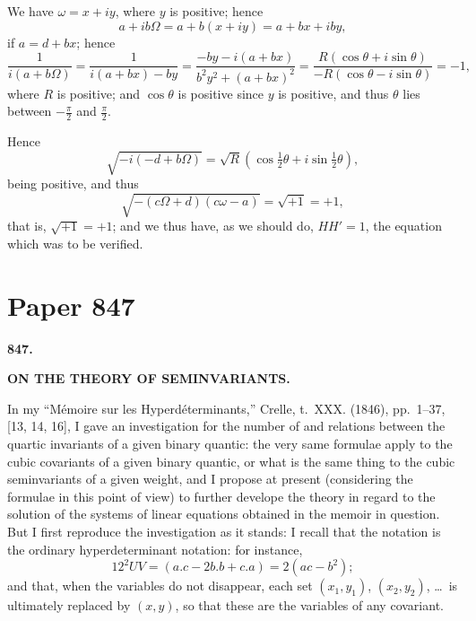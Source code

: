 \documentclass[11pt,a4paper]{article}
\theoremstyle{definition}
\begin{document}
We have $\omega = x + iy$, where $y$ is positive; hence
\[
a + ib\Omega = a + b(x + iy) = a + bx + iby,
\]
if $a = d + bx$; hence
\[
\frac{1}{i(a + b\Omega)} = \frac{1}{i(a + bx) - by} = \frac{-by - i(a + bx)}{b^2y^2 + (a + bx)^2} = \frac{R(\cos\theta + i\sin\theta)}{-R(\cos\theta - i\sin\theta)} = -1,
\]
where $R$ is positive; and $\cos\theta$ is positive since $y$ is positive, and thus $\theta$ lies between $-\frac{\pi}{2}$ and $\frac{\pi}{2}$.

Hence
\[
\sqrt{-i(-d + b\Omega)} = \sqrt{R}(\cos\tfrac{1}{2}\theta + i\sin\tfrac{1}{2}\theta),
\]
being positive, and thus
\[
\sqrt{-(c\Omega + d)(c\omega - a)} = \sqrt{+1} = +1,
\]
that is, $\sqrt{+1} = +1$; and we thus have, as we should do, $HH' = 1$, the equation which was to be verified.

\newpage

\section{Paper 847}

\begin{center}
\large\textbf{847.}

\Large\textbf{ON THE THEORY OF SEMINVARIANTS.}

\end{center}

\bigskip

In my ``M\'{e}moire sur les Hyperd\'{e}terminants,'' Crelle, t.~XXX. (1846), pp.~1--37, [13, 14, 16], I gave an investigation for the number of and relations between the quartic invariants of a given binary quantic: the very same formulae apply to the cubic covariants of a given binary quantic, or what is the same thing to the cubic seminvariants of a given weight, and I propose at present (considering the formulae in this point of view) to further develope the theory in regard to the solution of the systems of linear equations obtained in the memoir in question. But I first reproduce the investigation as it stands: I recall that the notation is the ordinary hyperdeterminant notation: for instance,
\[
12^2UV = (a.c - 2b.b + c.a) = 2(ac - b^2);
\]
and that, when the variables do not disappear, each set $(x_1, y_1)$, $(x_2, y_2)$, \ldots\ is ultimately replaced by $(x, y)$, so that these are the variables of any covariant.
\end{document}
